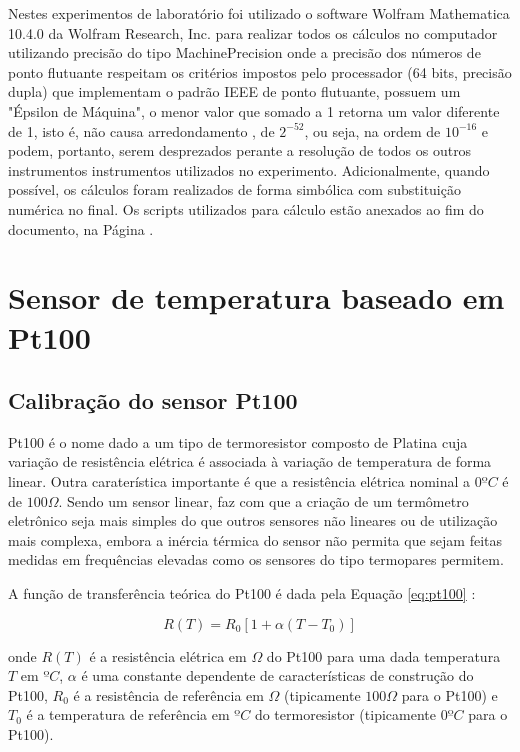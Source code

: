 \documentclass[a4paper]{instrumentacao}
\begin{document}
Nestes experimentos de laboratório foi utilizado o software Wolfram Mathematica 10.4.0 da Wolfram Research, Inc. para realizar todos os cálculos no computador utilizando precisão do tipo MachinePrecision\cite{mathematica-numerial-precision} onde a precisão dos números de ponto flutuante respeitam os critérios impostos pelo processador (64 bits, precisão dupla) que implementam o padrão IEEE de ponto flutuante, possuem um "Épsilon de Máquina", o menor valor que somado a 1 retorna um valor diferente de 1, isto é, não causa arredondamento \cite{wikipedia-epsilon}, de $2^{-52}$, ou seja, na ordem de $10^{-16}$ e podem, portanto, serem desprezados perante a resolução de todos os outros instrumentos instrumentos utilizados no experimento. Adicionalmente, quando possível, os cálculos foram realizados de forma simbólica com substituição numérica no final. Os scripts utilizados para cálculo estão anexados ao fim do documento, na Página \pageref{ch:attachments}.

\section{Sensor de temperatura baseado em Pt100}
\label{ch:pt100}

\subsection{Calibração do sensor Pt100}
\label{sec:resistencia-pt100}

Pt100 é o nome dado a um tipo de termoresistor composto de Platina cuja variação de resistência elétrica é associada à variação de temperatura de forma linear. Outra caraterística importante é que a resistência elétrica nominal a $0ºC$ é de $100 \Omega$. Sendo um sensor linear, faz com que a criação de um termômetro eletrônico seja mais simples do que outros sensores não lineares ou de utilização mais complexa, embora a inércia térmica do sensor não permita que sejam feitas medidas em frequências elevadas como os sensores do tipo termopares permitem.

A função de transferência teórica do Pt100 é dada pela Equação \ref{eq:pt100} \cite{livro-texto}:

\begin{equation}
	R(T) = R_0 \left[1 + \alpha\left(T - T_0\right)\right]
	\label{eq:pt100}
\end{equation}

\noindent
onde $R(T)$ é a resistência elétrica em $\Omega$ do Pt100 para uma dada temperatura $T$ em $ºC$, $\alpha$ é uma constante dependente de características de construção do Pt100, $R_0$ é a resistência de referência em $\Omega$ (tipicamente $100 \Omega$ para o Pt100) e $T_0$ é a temperatura de referência em $ºC$ do termoresistor (tipicamente $0ºC$ para o Pt100).
\end{document}
